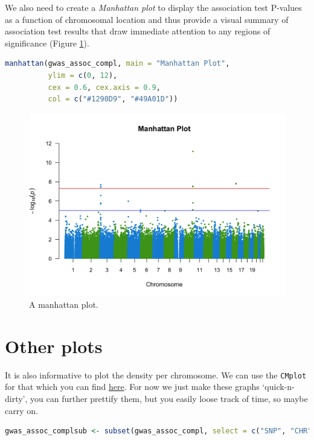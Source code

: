 \documentclass[
]{book}
\newcommand{\passthrough}[1]{#1}
\begin{document}
We also need to create a \emph{Manhattan plot} to display the association test P-values as a function of chromosomal location and thus provide a visual summary of association test results that draw immediate attention to any regions of significance (Figure \ref{fig:show-manhattan}).

\begin{lstlisting}[language=R]
manhattan(gwas_assoc_compl, main = "Manhattan Plot",
          ylim = c(0, 12),
          cex = 0.6, cex.axis = 0.9,
          col = c("#1290D9", "#49A01D"))
\end{lstlisting}

\begin{figure}

{\centering \includegraphics[width=18.67in]{img/_gwas/show-manhattan} 

}

\caption{A manhattan plot.}\label{fig:show-manhattan}
\end{figure}

\hypertarget{other-plots}{%
\section{Other plots}\label{other-plots}}

It is also informative to plot the density per chromosome. We can use the \passthrough{\lstinline!CMplot!} for that which you can find \href{https://github.com/YinLiLin/R-CMplot}{here}. For now we just make these graphs `quick-n-dirty', you can further prettify them, but you easily loose track of time, so maybe carry on.

\begin{lstlisting}[language=R]
gwas_assoc_complsub <- subset(gwas_assoc_compl, select = c("SNP", "CHR", "BP", "P"))
\end{lstlisting}
\end{document}

